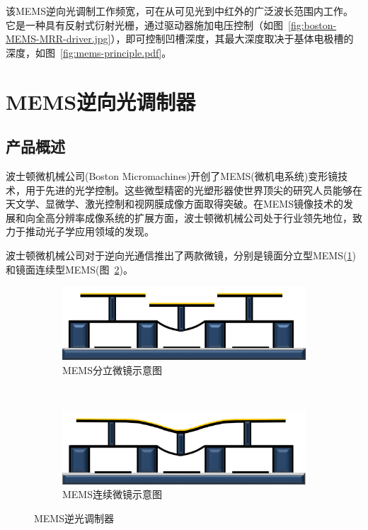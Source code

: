 该MEMS逆向光调制工作频宽，可在从可见光到中红外的广泛波长范围内工作。它是一种具有反射式衍射光栅，通过驱动器施加电压控制（如图~\ref{fig:boston-MEMS-MRR-driver.jpg}），即可控制凹槽深度，其最大深度取决于基体电极槽的深度，如图~\ref{fig:mems-principle.pdf}。

\section{MEMS逆向光调制器}
\subsection{产品概述}
波士顿微机械公司(Boston Micromachines)开创了MEMS(微机电系统)变形镜技术，用于先进的光学控制。这些微型精密的光塑形器使世界顶尖的研究人员能够在天文学、显微学、激光控制和视网膜成像方面取得突破。在MEMS镜像技术的发展和向全高分辨率成像系统的扩展方面，波士顿微机械公司处于行业领先地位，致力于推动光子学应用领域的发现。

波士顿微机械公司对于逆向光通信推出了两款微镜，分别是镜面分立型MEMS(\ref{fig:Segmented-DM.png})和镜面连续型MEMS(图~\ref{fig:Continuous-DM.png})。

\begin{figure}[!htbp]
	\centering
	\begin{subfigure}[c]{0.5\textwidth}
	\includegraphics[width=\textwidth]{./Img/Segmented-DM.png}
	\caption{MEMS分立微镜示意图}
	\label{fig:Segmented-DM.png}
	\end{subfigure}%
	~%
	\begin{subfigure}[c]{0.5\textwidth}
	\includegraphics[width=\textwidth]{./Img/Continuous-DM.png}
		\caption{MEMS连续微镜示意图}
		\label{fig:Continuous-DM.png}
	\end{subfigure}
	\caption{MEMS逆光调制器}
\label{fig:MEMS-MRR}
\end{figure}


